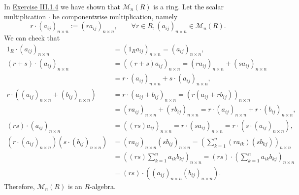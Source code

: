 \documentclass[12pt,letterpaper,boxed]{hmcpset}
\begin{document}
\begin{solution}
	In \hyperlink{Exercise III.1.4}{Exercise III.1.4} we have shown that $\mathcal{M}_{n}(R)$ is a ring. Let the scalar multiplication $\cdot$ be componentwise multiplication, namely
	\[
	r\cdot(a_{ij})_{n\times n}:=(ra_{ij})_{n\times n},\qquad\forall r\in R,(a_{ij})_{n\times n}\in \mathcal{M}_{n}(R).
	\]
	We can check that
	\begin{align*}
	1_R\cdot(a_{ij})_{n\times n}&=(1_Ra_{ij})_{n\times n}=(a_{ij})_{n\times n},\\
	(r+s)\cdot(a_{ij})_{n\times n}&=((r+s)a_{ij})_{n\times n}=(ra_{ij})_{n\times n}+(sa_{ij})_{n\times n}\\
	&=r\cdot(a_{ij})_{n\times n}+s\cdot(a_{ij})_{n\times n},\\
	r\cdot\left(\left(a_{ij}\right)_{n\times n}+\left(b_{ij}\right)_{n\times n}\right)&=r\cdot\left(a_{ij}+b_{ij}\right)_{n\times n}=\left(r\left(a_{ij}+rb_{ij}\right)\right)_{n\times n}\\
	&=\left(ra_{ij}\right)_{n\times n}+\left(rb_{ij}\right)_{n\times n}=r\cdot\left(a_{ij}\right)_{n\times n}+r\cdot\left(b_{ij}\right)_{n\times n},\\
	(rs)\cdot\left(a_{ij}\right)_{n\times n}&=	\left((rs)a_{ij}\right)_{n\times n}=r\cdot\left(sa_{ij}\right)_{n\times n}=r\cdot \left(s\cdot\left(a_{ij}\right)_{n\times n}\right),\\
	\left(r\cdot \left(a_{ij}\right)_{n\times n}\right)\left(s\cdot \left(b_{ij}\right)_{n\times n}\right)&=(ra_{ij})_{n\times n}(sb_{ij})_{n\times n}=\left(\sum_{k=1}^n\left(ra_{ik}\right)\left(sb_{kj}\right)\right)_{n\times n}\\
	&=\left((rs)\sum_{k=1}^n a_{ik}b_{kj}\right)_{n\times n}=(rs)\cdot\left(\sum_{k=1}^n a_{ik}b_{kj}\right)_{n\times n}\\
	&=(rs)\cdot\left(\left(a_{ij}\right)_{n\times n}\left(b_{ij}\right)_{n\times n}\right).
	\end{align*}
	Therefore, $\mathcal{M}_{n}(R)$ is an $R$-algebra.
\end{solution}
\end{document}
